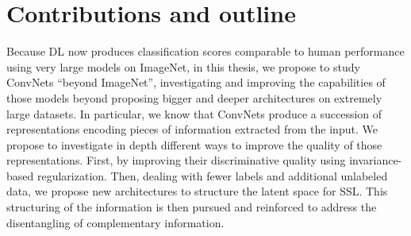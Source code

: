 \section{Contributions and outline}

Because \ac{DL} now produces classification scores comparable to human performance using very large models on ImageNet, in this thesis, we propose to study \acp{ConvNet} ``beyond ImageNet'', investigating and improving the capabilities of those models beyond proposing bigger and deeper architectures on extremely large datasets. In particular, we know that \acp{ConvNet} produce a succession of representations encoding pieces of information extracted from the input. We propose to investigate in depth different ways to improve the quality of those representations. First, by improving their discriminative quality using invariance-based regularization. Then, dealing with fewer labels and additional unlabeled data, we propose new architectures to structure the latent space for \acf{SSL}. This structuring of the information is then pursued and reinforced to address the disentangling of complementary information.

